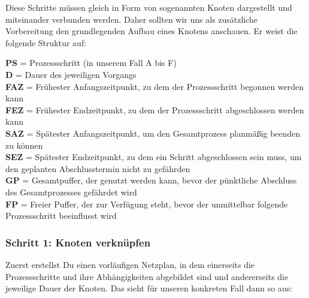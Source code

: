 Diese Schritte müssen gleich in Form von sogenannten Knoten dargestellt und miteinander verbunden werden. Daher sollten wir uns als zusätzliche Vorbereitung den grundlegenden Aufbau eines Knotens anschauen. Er weist die folgende Struktur auf:

\begin{center}
\end{center}

\textbf{PS} = Prozessschritt (in unserem Fall A bis F)\\
\textbf{D} = Dauer des jeweiligen Vorgangs\\
\textbf{FAZ} = Frühester Anfangszeitpunkt, zu dem der Prozessschritt begonnen werden kann\\
\textbf{FEZ} = Frühester Endzeitpunkt, zu dem der Prozessschritt abgeschlossen werden kann\\
\textbf{SAZ} = Spätester Anfangszeitpunkt, um den Gesamtprozess planmäßig beenden zu können\\
\textbf{SEZ} = Spätester Endzeitpunkt, zu dem ein Schritt abgeschlossen sein muss, um den geplanten Abschlusstermin nicht zu gefährden\\
\textbf{GP} = Gesamtpuffer, der genutzt werden kann, bevor der pünktliche Abschluss des Gesamtprozesses gefährdet wird\\
\textbf{FP} = Freier Puffer, der zur Verfügung steht, bevor der unmittelbar folgende Prozessschritt beeinflusst wird\\

\subsubsection{Schritt 1: Knoten verknüpfen}

Zuerst erstellst Du einen vorläufigen Netzplan, in dem einerseits die Prozessschritte und ihre Abhängigkeiten abgebildet sind und andererseits die jeweilige Dauer der Knoten. Das sieht für unseren konkreten Fall dann so aus:


